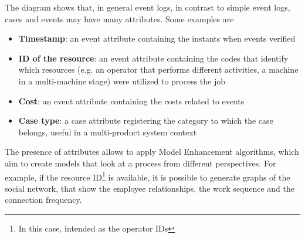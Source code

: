 The diagram shows that, in general event logs, in contrast to simple event logs, cases and events may have many attributes. Some examples are
\begin{itemize}
\item \textbf{Timestamp}: an event attribute containing the instants when events verified
\item \textbf{ID of the resource}: an event attribute containing the codes that identify which resources (e.g. an operator that performs different activities, a machine in a multi-machine stage) were utilized to process the job
\item \textbf{Cost}: an event attribute containing the costs related to events
\item \textbf{Case type}: a case attribute registering the category to which the case belongs, useful in a multi-product system context
\end{itemize}
The presence of attributes allows to apply Model Enhancement algorithms, which aim to create models that look at a process from different perspectives. For example, if the resource ID\footnote{In this case, intended as the operator IDs} is available, it is possible to generate graphs of the social network, that show the employee relationships, the work sequence and the connection frequency. 
